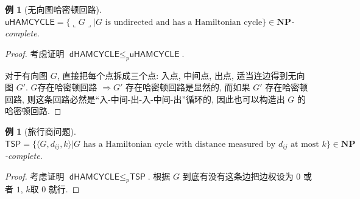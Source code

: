 \documentclass[8pt]{article}
\theoremstyle{compact}
\newtheorem{example}[theorem]{例}
\def\le{\leqslant}
\def\rep#1{\llcorner{#1}\lrcorner}
\def\NP{\textbf{NP}}
\begin{document}
\begin{example}[无向图哈密顿回路]
	$\textsf{uHAMCYCLE} = \{\rep{G} | G \text{ is undirected and has a Hamiltonian cycle}\} \in \NP$-complete.
\end{example}
\begin{proof}
	考虑证明 $\textsf{dHAMCYCLE} \le_p \textsf{uHAMCYCLE}$.

	对于有向图 $G$, 直接把每个点拆成三个点: 入点, 中间点, 出点, 适当连边得到无向图 $G'$. $G$存在哈密顿回路 $\Rightarrow G'$ 存在哈密顿回路是显然的, 而如果 $G'$ 存在哈密顿回路, 则这条回路必然是“入-中间-出-入-中间-出”循环的, 因此也可以构造出 $G$ 的哈密顿回路.
\end{proof}
\begin{example}[旅行商问题]
	$\textsf{TSP} = \{\langle G, d_{ij}, k \rangle | G \text{ has a Hamiltonian cycle with distance measured by } d_{ij} \text{ at most }k\} \in \NP$-complete.
\end{example}
\begin{proof}
	考虑证明 $\textsf{dHAMCYCLE} \le_p \textsf{TSP}$. 根据 $G$ 到底有没有这条边把边权设为 $0$ 或者 $1$, $k$取 $0$ 就行.
\end{proof}
\end{document}
